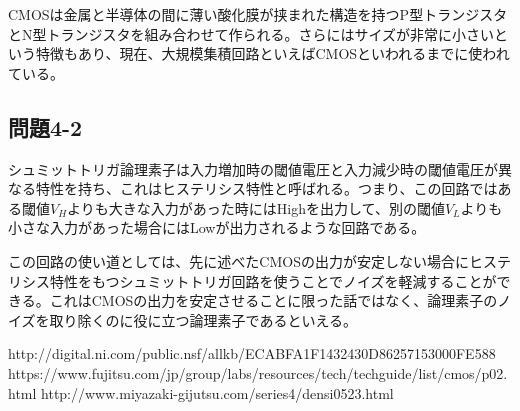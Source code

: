 \documentclass{jsarticle}
\begin{document}
CMOSは金属と半導体の間に薄い酸化膜が挟まれた構造を持つP型トランジスタとN型トランジスタを組み合わせて作られる。さらにはサイズが非常に小さいという特徴もあり、現在、大規模集積回路といえばCMOSといわれるまでに使われている。
\subsection{問題4-2}
シュミットトリガ論理素子は入力増加時の閾値電圧と入力減少時の閾値電圧が異なる特性を持ち、これはヒステリシス特性と呼ばれる。つまり、この回路ではある閾値$V_{H}$よりも大きな入力があった時にはHighを出力して、別の閾値$V_{L}$よりも小さな入力があった場合にはLowが出力されるような回路である。

この回路の使い道としては、先に述べたCMOSの出力が安定しない場合にヒステリシス特性をもつシュミットトリガ回路を使うことでノイズを軽減することができる。これはCMOSの出力を安定させることに限った話ではなく、論理素子のノイズを取り除くのに役に立つ論理素子であるといえる。

\begin{thebibliography}{3}
    \bibitem http://digital.ni.com/public.nsf/allkb/ECABFA1F1432430D86257153000FE588
    \bibitem https://www.fujitsu.com/jp/group/labs/resources/tech/techguide/list/cmos/p02.html
    \bibitem http://www.miyazaki-gijutsu.com/series4/densi0523.html
\end{thebibliography}
\end{document}

